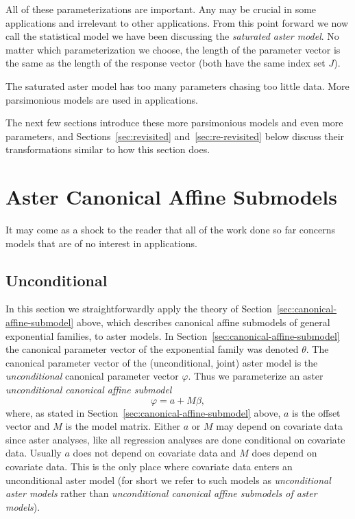 All of these parameterizations are important.  Any may be crucial in
some applications and irrelevant to other applications.  From this point
forward we now call the statistical model we have been discussing the
\emph{saturated aster model}.  No matter which parameterization we choose,
the length of the parameter vector is the same as the length of the response
vector (both have the same index set $J$).

The saturated aster model has too many parameters chasing too little data.
More parsimonious models are used in applications.

The next few sections introduce these more parsimonious models and
even more parameters,
and Sections~\ref{sec:revisited} and~\ref{sec:re-revisited} below
discuss their transformations similar to how this section does.

\section{Aster Canonical Affine Submodels}

It may come as a shock to the reader that all of the work done so far
concerns models that are of no interest in applications.

\subsection{Unconditional}

In this section we straightforwardly apply the theory
of Section~\ref{sec:canonical-affine-submodel} above,
which describes canonical affine submodels of general exponential families,
to aster models.  In Section~\ref{sec:canonical-affine-submodel} the canonical
parameter vector of the exponential family was denoted $\theta$.
The canonical parameter vector of the (unconditional, joint) aster model
is the \emph{unconditional} canonical parameter vector $\varphi$.
Thus we parameterize an aster \emph{unconditional canonical affine submodel}
\begin{equation} \label{eq:affine-unconditional}
   \varphi = a + M \beta,
\end{equation}
where, as stated in Section~\ref{sec:canonical-affine-submodel} above,
$a$ is the offset vector and $M$ is the model matrix.
Either $a$ or $M$ may depend on covariate data since aster analyses,
like all regression analyses are done conditional on covariate data.
Usually $a$ does not depend on covariate data and $M$ does depend
on covariate data.
This is the only place where covariate data enters
an unconditional aster model (for short we refer to such models
as \emph{unconditional aster models} rather than
\emph{unconditional canonical affine submodels of aster models}).

